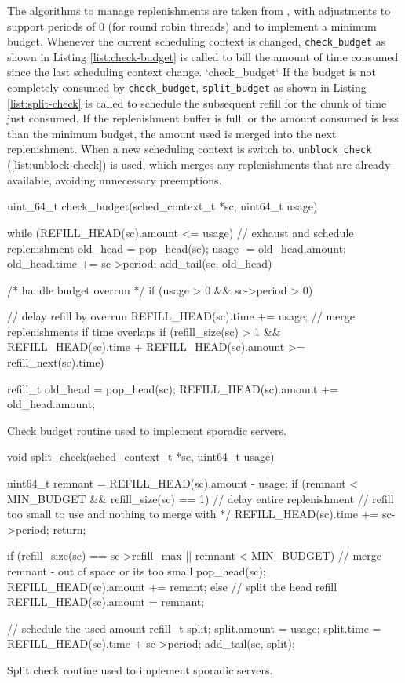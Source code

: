 The algorithms to manage replenishments are taken from \citet{Danish_LW_11}, with adjustments to
support periods of 0 (for round robin threads) and to implement a minimum budget.  Whenever the
current scheduling context is changed, \texttt{check\_budget} as shown in Listing
\ref{list:check-budget} is called to bill the amount of time consumed since the last scheduling
context change.  `check\_budget` If the budget is not completely consumed by \texttt{check\_budget},
\texttt{split\_budget} as shown in Listing \ref{list:split-check} is called to schedule the
subsequent refill for the chunk of time just consumed.  If the replenishment buffer is full, or the
amount consumed is less than the minimum budget, the amount used is merged into the next
replenishment.  When a new scheduling context is switch to, \texttt{unblock\_check} 
(\ref{list:unblock-check}) is used, which merges any replenishments that are already available,
avoiding unnecessary preemptions.

\begin{listing}[h]
\begin{ccode}

uint_64_t check_budget(sched_context_t *sc, uint64_t usage) {
  while (REFILL_HEAD(sc).amount <= usage) {
    // exhaust and schedule replenishment
    old_head = pop_head(sc);
    usage -= old_head.amount;
    old_head.time += sc->period;
    add_tail(sc, old_head)
  }

  /* handle budget overrun */
  if (usage > 0 && sc->period > 0) {
    // delay refill by overrun
    REFILL_HEAD(sc).time += usage;
    // merge replenishments if time overlaps
    if (refill_size(sc) > 1 &&
        REFILL_HEAD(sc).time + REFILL_HEAD(sc).amount
        >= refill_next(sc).time) {

      refill_t old_head = pop_head(sc);
      REFILL_HEAD(sc).amount += old_head.amount;
    }
  }
}
\end{ccode}
\caption{Check budget routine used to implement sporadic servers.}
\label{list:check-budget}
\end{listing}

\begin{listing}[h]
\begin{ccode}


void split_check(sched_context_t *sc, uint64_t usage) {
  uint64_t remnant = REFILL_HEAD(sc).amount - usage;
  if (remnant < MIN_BUDGET && refill_size(sc) == 1) {
    // delay entire replenishment
    // refill too small to use and nothing to merge with */
    REFILL_HEAD(sc).time += sc->period;
    return;
  }

  if (refill_size(sc) == sc->refill_max || remnant < MIN_BUDGET) {
    // merge remnant - out of space or its too small
    pop_head(sc);
    REFILL_HEAD(sc).amount += remant;
  } else {
    // split the head refill
    REFILL_HEAD(sc).amount = remnant;
  }

  // schedule the used amount
  refill_t split;
  split.amount = usage;
  split.time = REFILL_HEAD(sc).time + sc->period;
  add_tail(sc, split);
}
\end{ccode}
\caption{Split check routine used to implement sporadic servers.}
\label{list:split-check}
\end{listing}


